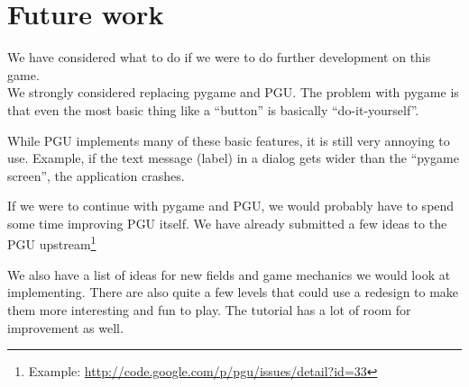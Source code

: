 \section{Future work}
We have considered what to do if we were to do further development
on this game.\\

We strongly considered replacing pygame and PGU.  The problem with
pygame is that even the most basic thing like a ``button'' is
basically ``do-it-yourself''.

While PGU implements many of these basic features, it is still very
annoying to use.  Example, if the text message (label) in a dialog
gets wider than the ``pygame screen'', the application crashes.

If we were to continue with pygame and PGU, we would probably have to
spend some time improving PGU itself.  We have already submitted a few
ideas to the PGU upstream\footnote{Example:
  \url{http://code.google.com/p/pgu/issues/detail?id=33}}

We also have a list of ideas for new fields and game mechanics we
would look at implementing.  There are also quite a few levels that
could use a redesign to make them more interesting and fun to play.
The tutorial has a lot of room for improvement as well.

